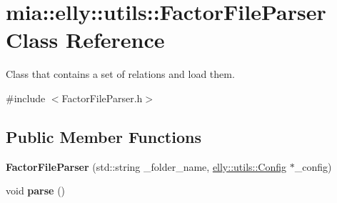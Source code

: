 \hypertarget{classmia_1_1elly_1_1utils_1_1_factor_file_parser}{\section{mia\-:\-:elly\-:\-:utils\-:\-:Factor\-File\-Parser Class Reference}
\label{classmia_1_1elly_1_1utils_1_1_factor_file_parser}
}


Class that contains a set of relations and load them.  




{\ttfamily \#include $<$Factor\-File\-Parser.\-h$>$}

\subsection*{Public Member Functions}
\begin{DoxyCompactItemize}
\item 
\hypertarget{classmia_1_1elly_1_1utils_1_1_factor_file_parser_a96a66a45bba45334c0e6c27f6f37a014}{{\bfseries Factor\-File\-Parser} (std\-::string \-\_\-folder\-\_\-name, \hyperlink{classmia_1_1elly_1_1utils_1_1_config}{elly\-::utils\-::\-Config} $\ast$\-\_\-config)}\label{classmia_1_1elly_1_1utils_1_1_factor_file_parser_a96a66a45bba45334c0e6c27f6f37a014}

\item 
\hypertarget{classmia_1_1elly_1_1utils_1_1_factor_file_parser_a7e4ab3e5026f1daa511bf4eb813200da}{void {\bfseries parse} ()}\label{classmia_1_1elly_1_1utils_1_1_factor_file_parser_a7e4ab3e5026f1daa511bf4eb813200da}

\end{DoxyCompactItemize}
